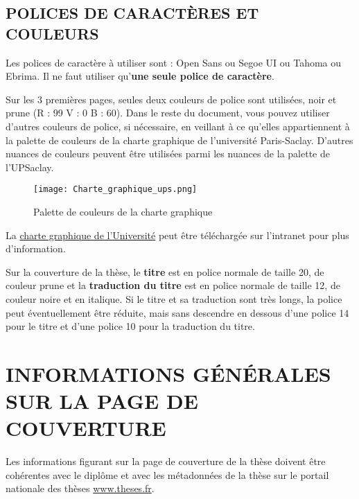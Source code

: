 \section{POLICES DE CARACTÈRES ET COULEURS}
Les polices de caractère à utiliser sont : Open Sans ou Segoe UI ou Tahoma ou Ebrima. Il ne faut utiliser qu’\textbf{une seule police de caractère}.\\ \par
Sur les 3 premières pages, seules deux couleurs de police sont utilisées, noir et prune (R : 99 V : 0 B : 60). Dans le reste du document, vous pouvez utiliser d’autres couleurs de police, si nécessaire, en veillant à ce qu’elles appartiennent à la palette de couleurs de la charte graphique de l’université Paris-Saclay.  D’autres nuances de couleurs peuvent être utilisées parmi les nuances de la palette de l’UPSaclay.\\ \par

\begin{figure}
\begin{center} 
\texttt{[image: Charte\_graphique\_ups.png]}
\end{center}
\caption{Palette de couleurs de la charte graphique}
\end{figure}
La \href{https://portail.universite-paris-saclay.fr/communication/Pages/Charte-graphique.aspx}{charte graphique de l’Université} peut être téléchargée sur l’intranet pour plus d’information.\\ \par
Sur la couverture de la thèse, le \textbf{titre} est en police normale de taille 20, de couleur prune et la \textbf{traduction du titre} est en police normale de taille 12, de couleur noire et en italique. Si le titre et sa traduction sont très longs, la police peut éventuellement être réduite, mais sans descendre en dessous d’une police 14 pour le titre et d’une police 10 pour la traduction du titre.

\chapter{INFORMATIONS GÉNÉRALES SUR LA PAGE DE COUVERTURE}
Les informations figurant sur la page de couverture de la thèse doivent être cohérentes avec le diplôme et avec les métadonnées de la thèse sur le portail nationale des thèses \url{www.theses.fr}.
